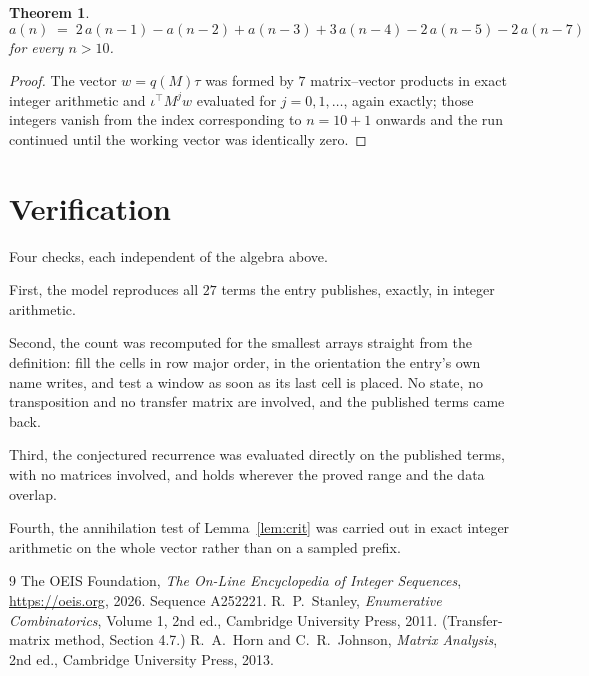 \documentclass[11pt,a4paper]{article}
\theoremstyle{plain}
\newtheorem{theorem}{Theorem}
\theoremstyle{definition}
\begin{document}
\begin{theorem}
\[
a(n)\;=\;2\,a(n-1) - a(n-2) + a(n-3) + 3\,a(n-4) - 2\,a(n-5) - 2\,a(n-7)
\]
for every $n>10$.
\end{theorem}

\begin{proof}
The vector $w=q(M)\tau$ was formed by $7$ matrix--vector products in exact integer
arithmetic and $\iota^{\!\top}M^{j}w$ evaluated for $j=0,1,\dots$, again exactly; those
integers vanish from the index corresponding to $n=10+1$ onwards and the run continued
until the working vector was identically zero.
\end{proof}

\section{Verification}

Four checks, each independent of the algebra above.

First, the model reproduces all $27$ terms the entry publishes, exactly, in integer
arithmetic.

Second, the count was recomputed for the smallest arrays straight from the definition: fill the
cells in row major order, in the orientation the entry's own name writes, and test a window as
soon as its last cell is placed. No state, no transposition and no transfer matrix are
involved, and the published terms came back.

Third, the conjectured recurrence was evaluated directly on the published terms, with no
matrices involved, and holds wherever the proved range and the data overlap.

Fourth, the annihilation test of Lemma~\ref{lem:crit} was carried out in exact integer
arithmetic on the whole vector rather than on a sampled prefix.

\begin{thebibliography}{9}
 The OEIS Foundation, \emph{The On-Line Encyclopedia of Integer
Sequences}, \url{https://oeis.org}, 2026. Sequence A252221.
 R.~P.~Stanley, \emph{Enumerative Combinatorics}, Volume 1, 2nd ed.,
Cambridge University Press, 2011. (Transfer-matrix method, Section 4.7.)
 R.~A.~Horn and C.~R.~Johnson, \emph{Matrix Analysis}, 2nd ed., Cambridge
University Press, 2013.
\end{thebibliography}
\end{document}
